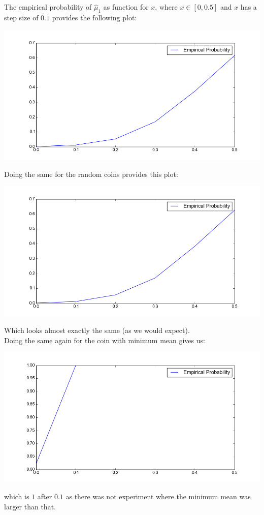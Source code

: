 \documentclass[a4paper]{article}
\begin{document}
\subsection{}
The empirical probability of $\hat{\mu}_1$ as function for $x$, where $x\in [0, 0.5]$ and $x$ has a step size of $0.1$ provides the following plot:
\begin{center}
	\includegraphics[scale=0.5]{emp1}
\end{center}
Doing the same for the random coins provides this plot:
\begin{center}
	\includegraphics[scale=0.5]{emp2}
\end{center}
Which looks almost exactly the same (as we would expect). \\
Doing the same again for the coin with minimum mean gives us:
\begin{center}
	\includegraphics[scale=0.5]{emp3}
\end{center}
which is $1$ after $0.1$ as there was not experiment where the minimum mean was larger than that.
\end{document}
